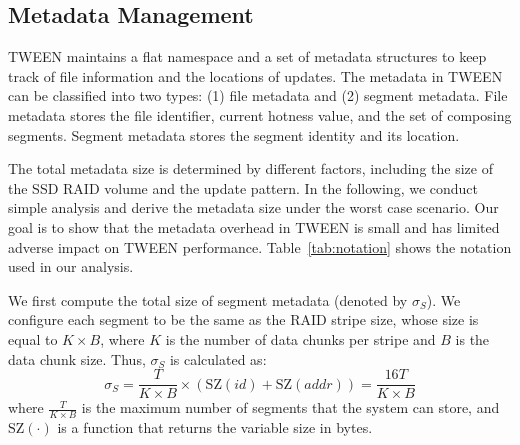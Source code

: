 \subsection{Metadata Management}
\label{subsec:metadata}


TWEEN maintains a flat namespace and a set of metadata structures to 
keep track of file information and the locations of updates.  The metadata in
TWEEN can be classified into two types: (1) file metadata and (2) segment
metadata. File metadata stores the file identifier, current hotness value, and
the set of composing segments. Segment metadata stores the segment identity
and its location.  

The total metadata size is determined by different factors, including the size
of the SSD RAID volume and the update pattern.  In the following, we conduct
simple analysis and derive the metadata size under the worst case scenario.
Our goal is to show that the metadata overhead in TWEEN is small and has
limited adverse impact on TWEEN performance.  Table~\ref{tab:notation} shows
the notation used in our analysis. 


We first compute the total size of segment metadata (denoted by $\sigma_{S}$). 
We configure each segment to be the same as the RAID stripe size, whose size
is equal to $K\times B$, where $K$ is the number of data chunks per stripe and
$B$ is the data chunk size.   Thus, $\sigma_{S}$ is calculated as:
\begin{equation}
    \label{eqn:nvram_segment}
	\sigma_{S} = \frac{T}{K\times B} \times
	(\mathrm{SZ}(id)+\mathrm{SZ}(addr)) =
    \frac{16T}{K\times B}
\end{equation}
%
where $\frac{T}{K\times B}$ is the maximum number of segments that the system
can store, and $\mathrm{SZ}(\cdot)$ is a function that returns the variable
size in bytes.

